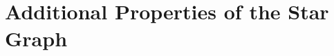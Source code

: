 \documentclass[reprint,prb,superscriptaddress]{revtex4-2}
\begin{document}
\section{Additional Properties of the Star Graph}
\end{document}
